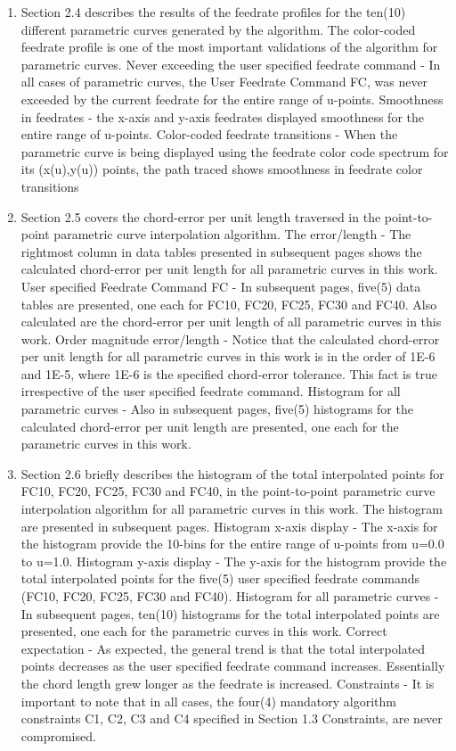 \begin{enumerate}
	\item Section 2.4 describes the results of the feedrate profiles for the ten(10) different parametric curves generated by the algorithm. The color-coded feedrate profile is one of the most important validations of the algorithm for parametric curves. Never exceeding the user specified feedrate command - In all cases of parametric curves, the User Feedrate Command FC, was never exceeded by the current feedrate
	for the entire range of u-points. Smoothness in feedrates - the x-axis and y-axis feedrates displayed smoothness for the entire range of u-points. Color-coded feedrate transitions - When the parametric curve is being displayed using the feedrate color code spectrum for its (x(u),y(u)) points, the path traced shows smoothness in feedrate color transitions
	
	\item Section 2.5 covers the chord-error per unit length traversed in the point-to-point parametric curve interpolation algorithm. The error/length - The rightmost column in data tables presented in subsequent pages shows the calculated chord-error per unit length for all parametric curves in this work. User specified Feedrate Command FC - In subsequent pages, five(5) data tables are presented, one each for FC10, FC20, FC25, FC30 and FC40. Also calculated are the chord-error per unit length of all parametric curves in this work. Order magnitude error/length - Notice that the calculated chord-error per unit length for all parametric curves in this work is in the order of 1E-6 and 1E-5, where 1E-6 is the specified chord-error tolerance. This fact is true irrespective of the user specified feedrate command. Histogram for all parametric curves - Also in subsequent pages, five(5) histograms for the calculated chord-error per unit length are presented, one each for the parametric curves in this work.
	
	\item Section 2.6 briefly describes the histogram of the total interpolated points for FC10, FC20, FC25, FC30 and FC40, in the point-to-point parametric curve interpolation algorithm for all parametric curves in this work. The histogram are presented in subsequent pages. Histogram x-axis display - The x-axis for the histogram provide the 10-bins for the entire range of u-points from u=0.0 to u=1.0. Histogram y-axis display - The y-axis for the histogram provide the total interpolated points for the five(5) user specified feedrate commands (FC10, FC20, FC25,	FC30 and FC40). Histogram for all parametric curves - In subsequent pages, ten(10) histograms for the total interpolated points are presented, one each for the parametric curves in this work. Correct expectation - As expected, the general trend is that the total interpolated points decreases as the user specified feedrate command increases. Essentially the chord length grew longer as the feedrate is increased. Constraints - It is important to note that in all cases, the four(4) mandatory algorithm constraints C1, C2, C3 and C4 specified in Section 1.3 Constraints, are never compromised.
	
\end{enumerate}












